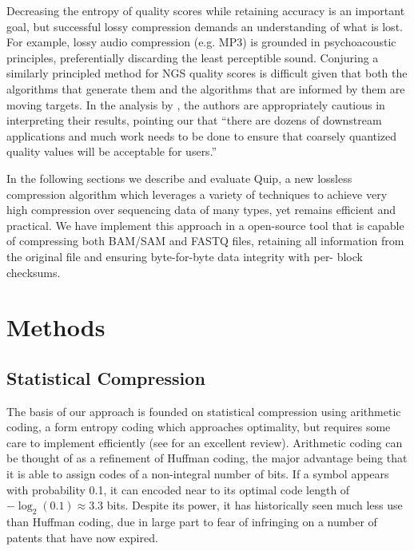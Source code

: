 \documentclass[a4,center,fleqn]{NAR}
\begin{document}
Decreasing the entropy of quality scores while retaining accuracy is an
important goal, but successful lossy compression demands an understanding of
what is lost. For example, lossy audio compression (e.g. MP3) is grounded in
psychoacoustic principles, preferentially discarding the least perceptible
sound. Conjuring a similarly principled method for NGS quality scores is
difficult given that both the algorithms that generate them and the algorithms
that are informed by them are moving targets. In the analysis by
\citet{Kozanitis2011}, the authors are appropriately cautious in interpreting
their results, pointing our that ``there are dozens of downstream applications
and much work needs to be done to ensure that coarsely quantized quality
values will be acceptable for users.''



In the following sections we describe and evaluate Quip, a new lossless
compression algorithm which leverages a variety of techniques to achieve very
high compression over sequencing data of many types, yet remains efficient and
practical. We have implement this approach in a open-source tool that is
capable of compressing both BAM/SAM and FASTQ files, retaining all information
from the original file and ensuring byte-for-byte data integrity with per-
block checksums.



\section{Methods}

\subsection{Statistical Compression}

The basis of our approach is founded on statistical compression using
arithmetic coding, a form entropy coding which approaches optimality, but
requires some care to implement efficiently (see \citet{Said2004} for an
excellent review). Arithmetic coding can be thought of as a refinement of
Huffman coding, the major advantage being that it is able to assign codes of a
non-integral number of bits. If a symbol appears with probability 0.1, it can
encoded near to its optimal code length of $-\log_2(0.1) \approx 3.3$ bits.
Despite its power, it has historically seen much less use than Huffman coding,
due in large part to fear of infringing on a number of patents that have now
expired.
\end{document}

